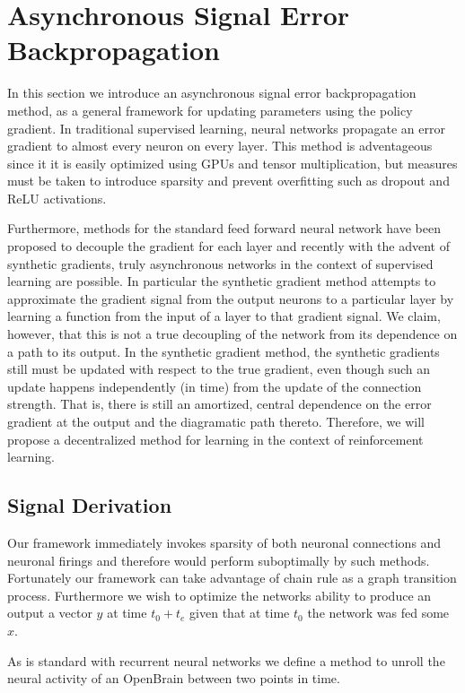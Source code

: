 \section{Asynchronous Signal Error Backpropagation}

In this section we introduce an asynchronous signal error backpropagation method,
as a general framework for updating parameters using the policy gradient. In traditional
supervised learning, neural networks propagate an error gradient to almost every neuron on every layer.
This method is adventageous since it it is easily optimized using GPUs and tensor multiplication, but measures must be 
taken to introduce sparsity and prevent overfitting such as dropout and ReLU activations. 

Furthermore, methods for the standard feed forward neural network have been proposed to decouple the gradient for each layer and recently with the advent of synthetic gradients, truly asynchronous networks in the context of supervised learning are possible. In particular the synthetic gradient method attempts to approximate the gradient signal from the output neurons to a particular layer by learning a function from the input of a layer to that gradient signal. We claim, however, that this is not a true decoupling of the network from its dependence on a path to its output. In the synthetic gradient method, the synthetic gradients still must be updated with respect to the true gradient, even though such an update happens independently (in time) from the update of the connection strength. That is, there is still an amortized, central dependence on the error gradient at the output and the diagramatic path thereto. Therefore, we will propose a decentralized method for learning in the context of reinforcement learning.


\subsection{Signal Derivation}

Our framework immediately invokes sparsity of both neuronal connections and neuronal firings and therefore would perform suboptimally 
by such methods. Fortunately our framework can take advantage of chain rule as a graph transition process. Furthermore we wish to optimize the networks
ability to produce an output a vector $y$ at time $t_0+t_e$ given that at time $t_0$ the network was fed some $x$.

As is standard with recurrent neural networks we define a method to unroll the neural activity of an OpenBrain between two points in time.

